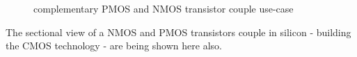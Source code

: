 \begin{center}
    \begin{figure}[h] \caption{complementary PMOS and NMOS transistor couple use-case}
        \begin{circuitdiagram}{20}{20}
        \end{circuitdiagram}
    \end{figure}
\end{center}

The sectional view of a NMOS and PMOS transistors couple in silicon - building the CMOS technology - are being shown here also.
